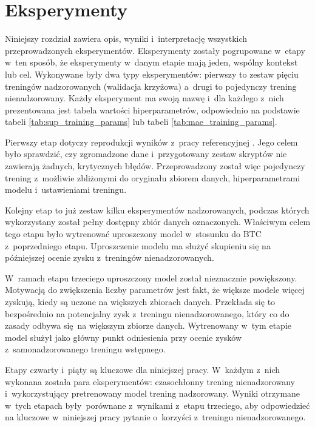 \chapter{Eksperymenty} \label{chapter:experiments}

Niniejszy rozdział zawiera opis, wyniki i~interpretację wszystkich przeprowadzonych eksperymentów. Eksperymenty zostały pogrupowane w~etapy w~ten sposób, że eksperymenty w~danym etapie mają jeden, wspólny kontekst lub cel. Wykonywane były dwa typy eksperymentów: pierwszy to zestaw pięciu treningów nadzorowanych (walidacja krzyżowa) a~drugi to pojedynczy trening nienadzorowany. Każdy eksperyment ma swoją nazwę i~dla każdego z~nich prezentowana jest tabela wartości hiperparametrów, odpowiednio na podstawie tabeli \ref{tab:sup_training_params} lub tabeli \ref{tab:mae_training_params}.

Pierwszy etap dotyczy reprodukcji wyników z~pracy referencyjnej \cite{park_bi-directional_2019}. Jego celem było sprawdzić, czy zgromadzone dane i~przygotowany zestaw skryptów nie zawierają żadnych, krytycznych błędów. Przeprowadzony został więc pojedynczy trening z~możliwie zbliżonymi do oryginału zbiorem danych, hiperparametrami modelu i~ustawieniami treningu.

Kolejny etap to już zestaw kilku eksperymentów nadzorowanych, podczas których wykorzystany został pełny dostępny zbiór danych oznaczonych. Właściwym celem tego etapu było wytrenować uproszczony model w~stosunku do BTC z~poprzedniego etapu. Uproszczenie modelu ma służyć skupieniu się na późniejszej ocenie zysku z~treningów nienadzorowanych.

W~ramach etapu trzeciego uproszczony model został nieznacznie powiększony. Motywacją do zwiększenia liczby parametrów jest fakt, że większe modele więcej zyskują, kiedy są uczone na większych zbiorach danych. Przekłada się to bezpośrednio na potencjalny zysk z~treningu nienadzorowanego, który co do zasady odbywa się na większym zbiorze danych. Wytrenowany w~tym etapie model służył jako główny punkt odniesienia przy ocenie zysków z~samonadzorowanego treningu wstępnego.

Etapy czwarty i~piąty są kluczowe dla niniejszej pracy. W~każdym z~nich wykonana została para eksperymentów: czasochłonny trening nienadzorowany i~wykorzystujący pretrenowany model trening nadzorowany. Wyniki otrzymane w~tych etapach były porównane z~wynikami z~etapu trzeciego, aby odpowiedzieć na kluczowe w~niniejszej pracy pytanie o~korzyści z~treningu nienadzorowanego.

